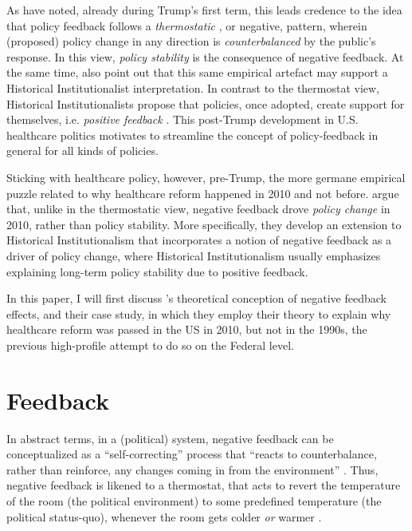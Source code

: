 \documentclass[11pt]{article}
\begin{document}
\begin{figure}[H]
    \sffamily
    
        \label{fig:aca_fav}
\end{figure}


\noindent As \textcite[][]{Busemeyer2019} have noted, already during Trump's first term, this leads credence to the idea that policy feedback follows a \textit{thermostatic} \parencite[][]{Wlezien1995}, or negative, pattern, wherein (proposed) policy change in any direction is \textit{counterbalanced} by the public's response. In this view, \textit{policy stability} is the consequence of negative feedback. At the same time, \textcite[][]{Busemeyer2019} also point out that this same empirical artefact may support a Historical Institutionalist interpretation. In contrast to the thermostat view, Historical Institutionalists propose that policies, once adopted, create support for themselves, i.e. \textit{positive feedback} \parencites[see e.g.][]{Pierson1993}{Pierson2000}. This post-Trump development in U.S. healthcare politics motivates \textcite[][]{Busemeyer2019} to streamline the concept of policy-feedback in general for all kinds of policies.

Sticking with healthcare policy, however, pre-Trump, the more germane empirical puzzle related to why healthcare reform happened in 2010 and not before. \textcite[][]{Jacobs2014} argue that, unlike in the thermostatic view, negative feedback drove \textit{policy change} in 2010, rather than policy stability. More specifically, they develop an extension to Historical Institutionalism that incorporates a notion of negative feedback as a driver of policy change, where Historical Institutionalism usually emphasizes explaining long-term policy stability due to positive feedback. 

In this paper, I will first discuss \citeauthor[][]{Jacobs2014}'s \parencite*{Jacobs2014} theoretical conception of negative feedback effects, and their case study, in which they employ their theory to explain why healthcare reform was passed in the US in 2010, but not in the 1990s, the previous high-profile attempt to do so on the Federal level.


\section*{Feedback}

In abstract terms, in a (political) system, negative feedback can be conceptualized as a \enquote{self-correcting} \parencite[][p. 8]{Baumgartner2002} process that \enquote{reacts to counterbalance, rather than reinforce, any changes coming in from the environment} . Thus, negative feedback is likened to a thermostat, that acts to revert the temperature of the room (the political environment) to some predefined temperature (the political status-quo), whenever the room gets colder \textit{or} warmer \parencite[][]{Wlezien1995}.
\end{document}

